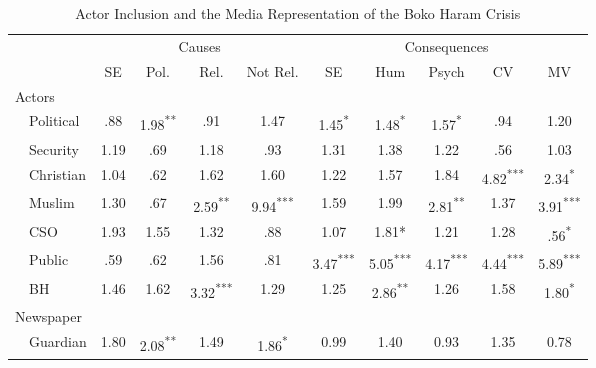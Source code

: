 \newpage
\begin{table}[H]
\begin{adjustwidth}{-0.1in}{-0.2in} %
\caption{Actor Inclusion and the Media Representation of the Boko Haram Crisis}
\label{tab:art3-tab2}
\onehalfspacing
\small
\begin{tabular}{@{}llccccccccc@{}}
\toprule
          &                   & \multicolumn{4}{c}{Causes}         & \multicolumn{5}{c}{Consequences}                \\ \cmidrule(l){3-11} 
\multicolumn{2}{l}{}          & SE   & Pol.   & Rel.    & Not Rel. & SE      & Hum     & Psych   & CV      & MV      \\ \midrule
\multicolumn{2}{l}{Actors}    &      &        &         &          &         &         &         &         &         \\
          & Political         & .88  & 1.98\textsuperscript{**} & .91     & 1.47     & 1.45\textsuperscript{*}   & 1.48\textsuperscript{*}   & 1.57\textsuperscript{*}   & .94     & 1.20    \\
          & Security          & 1.19 & .69    & 1.18    & .93      & 1.31    & 1.38    & 1.22    & .56     & 1.03    \\
          & Christian         & 1.04 & .62    & 1.62    & 1.60     & 1.22    & 1.57    & 1.84    & 4.82\textsuperscript{***} & 2.34\textsuperscript{*}   \\
          & Muslim            & 1.30 & .67    & 2.59\textsuperscript{**}  & 9.94\textsuperscript{***}  & 1.59    & 1.99    & 2.81\textsuperscript{**}  & 1.37    & 3.91\textsuperscript{***} \\
          & CSO               & 1.93 & 1.55   & 1.32    & .88      & 1.07    & 1.81*   & 1.21    & 1.28    & .56\textsuperscript{*}    \\
          & Public            & .59  & .62    & 1.56    & .81      & 3.47\textsuperscript{***} & 5.05\textsuperscript{***} & 4.17\textsuperscript{***} & 4.44\textsuperscript{***} & 5.89\textsuperscript{***} \\
          & BH                & 1.46 & 1.62   & 3.32\textsuperscript{***} & 1.29     & 1.25    & 2.86\textsuperscript{**}  & 1.26    & 1.58    & 1.80\textsuperscript{*}   \\
\multicolumn{2}{l}{Newspaper} &      &        &         &          &         &         &         &         &         \\
          & Guardian          & 1.80 & 2.08\textsuperscript{**} & 1.49    & 1.86\textsuperscript{*}    & 0.99    & 1.40    & 0.93    & 1.35    & 0.78   \\*\bottomrule
\end{tabular}
\end{adjustwidth}
\end{table}

